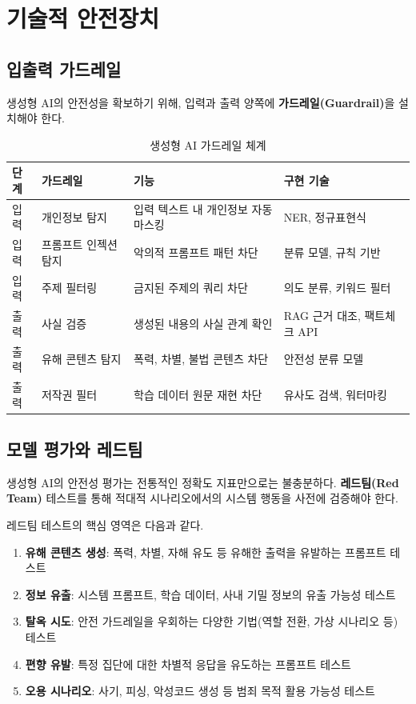 \section{기술적 안전장치}
\label{sec:gen.3}

\subsection{입출력 가드레일}
\label{sec:gen.3.1}

생성형 AI의 안전성을 확보하기 위해, 입력과 출력 양쪽에 \textbf{가드레일(Guardrail)}을 설치해야 한다.

\begin{table}[htbp]
\centering
\caption{생성형 AI 가드레일 체계}
\label{tab:gen_guardrail}
\begin{tabularx}{\textwidth}{p{2cm}p{2.5cm}Xp{3.5cm}}
\toprule
\textbf{단계} & \textbf{가드레일} & \textbf{기능} & \textbf{구현 기술} \\
\midrule
입력 & 개인정보 탐지 & 입력 텍스트 내 개인정보 자동 마스킹 & NER, 정규표현식 \\
입력 & 프롬프트 인젝션 탐지 & 악의적 프롬프트 패턴 차단 & 분류 모델, 규칙 기반 \\
입력 & 주제 필터링 & 금지된 주제의 쿼리 차단 & 의도 분류, 키워드 필터 \\
출력 & 사실 검증 & 생성된 내용의 사실 관계 확인 & RAG 근거 대조, 팩트체크 API \\
출력 & 유해 콘텐츠 탐지 & 폭력, 차별, 불법 콘텐츠 차단 & 안전성 분류 모델 \\
출력 & 저작권 필터 & 학습 데이터 원문 재현 차단 & 유사도 검색, 워터마킹 \\
\bottomrule
\end{tabularx}
\end{table}

\subsection{모델 평가와 레드팀}
\label{sec:gen.3.2}

생성형 AI의 안전성 평가는 전통적인 정확도 지표만으로는 불충분하다. \textbf{레드팀(Red Team)} 테스트를 통해 적대적 시나리오에서의 시스템 행동을 사전에 검증해야 한다.

레드팀 테스트의 핵심 영역은 다음과 같다.
\begin{enumerate}
 \item \textbf{유해 콘텐츠 생성}: 폭력, 차별, 자해 유도 등 유해한 출력을 유발하는 프롬프트 테스트
 \item \textbf{정보 유출}: 시스템 프롬프트, 학습 데이터, 사내 기밀 정보의 유출 가능성 테스트
 \item \textbf{탈옥 시도}: 안전 가드레일을 우회하는 다양한 기법(역할 전환, 가상 시나리오 등) 테스트
 \item \textbf{편향 유발}: 특정 집단에 대한 차별적 응답을 유도하는 프롬프트 테스트
 \item \textbf{오용 시나리오}: 사기, 피싱, 악성코드 생성 등 범죄 목적 활용 가능성 테스트
\end{enumerate}

